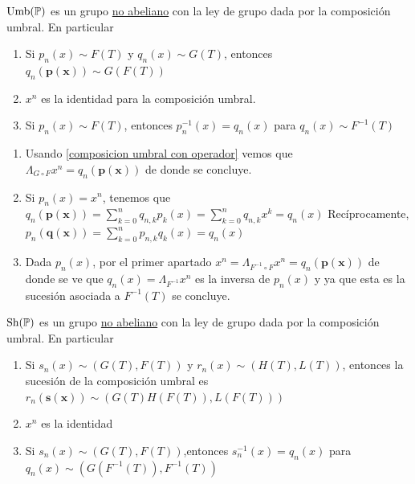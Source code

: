 \begin{teorema}
    $\operatorname*{Umb(\mathbb{P})}$ es un grupo \underline{no abeliano} con la ley de grupo dada por la composición umbral. En particular
    \begin{enumerate}
        \item Si $p_n(x) \sim F(T)$ y $q_n(x) \sim G(T)$, entonces $q_n(\mathbf{p(x)}) \sim G(F(T))$ 
        \item $x^n$ es la identidad para la composición umbral.
        \item Si $p_n(x) \sim F(T)$, entonces $p_n^{-1}(x) = q_n(x)$ para $q_n(x) \sim F^{-1}(T)$
    \end{enumerate}
\end{teorema}

\begin{demo}
    \begin{enumerate}
        \item Usando \eqref{composicion umbral con operador} vemos que $\Lambda_{G \circ F} x^n = q_n(\mathbf{p(x)})$ de donde se concluye.
        \item Si $p_n(x) = x^n$, tenemos que $q_n(\mathbf{p(x)}) = \sum_{k=0}^{n} q_{n,k} p_k(x) = \sum_{k=0}^{n} q_{n,k} x^k = q_n(x)$ Recíprocamente, $p_n(\mathbf{q(x)}) = \sum_{k=0}^n p_{n,k} q_k(x) = q_n(x)$
        \item Dada $p_n(x)$, por el primer apartado $x^n = \Lambda_{F^{-1} \circ F}x^n = q_n(\mathbf{p(x)})$ de donde se ve que $q_n(x) = \Lambda_{F^{-1}}x^n$ es la inversa de $p_n(x)$ y ya que esta es la sucesión asociada a $F^{-1}(T)$ se concluye. \qedhere
    \end{enumerate}
\end{demo}

\begin{corolario}
    $\operatorname*{Sh(\mathbb{P})}$ es un grupo \underline{no abeliano} con la ley de grupo dada por la composición umbral. En particular
    \begin{enumerate}
        \item Si $s_n(x) \sim (G(T), F(T))$ y  $r_n(x) \sim (H(T), L(T))$, entonces la sucesión de la composición umbral es $r_n(\mathbf{s(x)}) \sim (G(T)H(F(T)), L(F(T)))$ 
        \item $x^n$ es la identidad 
        \item Si $s_n(x) \sim (G(T), F(T))$,entonces $s_n^{-1}(x) = q_n(x)$ para $q_n(x) \sim (G(F^{-1}(T)), F^{-1}(T))$
    \end{enumerate}
\end{corolario}

